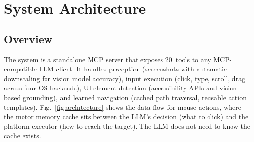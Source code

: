 \documentclass[conference]{IEEEtran}
\begin{document}
\section{System Architecture}

\subsection{Overview}

The system is a standalone MCP server that exposes 20~tools to any MCP-compatible LLM client. It handles perception (screenshots with automatic downscaling for vision model accuracy), input execution (click, type, scroll, drag across four OS backends), UI element detection (accessibility APIs and vision-based grounding), and learned navigation (cached path traversal, reusable action templates). Fig.~\ref{fig:architecture} shows the data flow for mouse actions, where the motor memory cache sits between the LLM's decision (what to click) and the platform executor (how to reach the target). The LLM does not need to know the cache exists.
\end{document}
